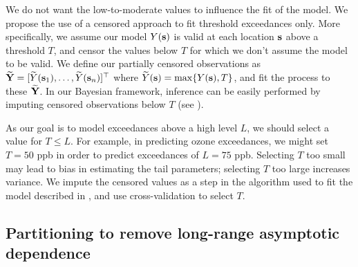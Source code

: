 We do not want the low-to-moderate values to influence the fit of the model.
We propose the use of a censored approach to fit threshold exceedances only.
More specifically, we assume our \skewt{} model $Y(\mathbf{s})$ is valid at each location $\mathbf{s}$ above a threshold $T$, and censor the values below $T$ for which we don't assume the model to be valid.
We define our partially censored observations as $\widetilde{\mathbf{Y}} = [\widetilde{Y}(\mathbf{s}_1), \ldots, \widetilde{Y}(\mathbf{s}_n)]^\top$ where $\widetilde{Y}(\mathbf{s}) = \max\{Y(\mathbf{s}), T\}$, and fit the \skewt{} process to these $\widetilde{\mathbf{Y}}$.
In our Bayesian framework, inference can be easily performed by imputing censored observations below $T$ (see ).

As our goal is to model exceedances above a high level $L$, we should select a value for $T \le L$.
For example, in predicting ozone exceedances, we might set $T = 50$ ppb in order to predict exceedances of $L = 75$ ppb.
Selecting $T$ too small may lead to bias in estimating the tail parameters; selecting $T$ too large increases variance.
We impute the censored values as a step in the algorithm used to fit the model described in , and use cross-validation to select $T$.

\subsection{Partitioning to remove long-range asymptotic dependence}\label{sts:part}

